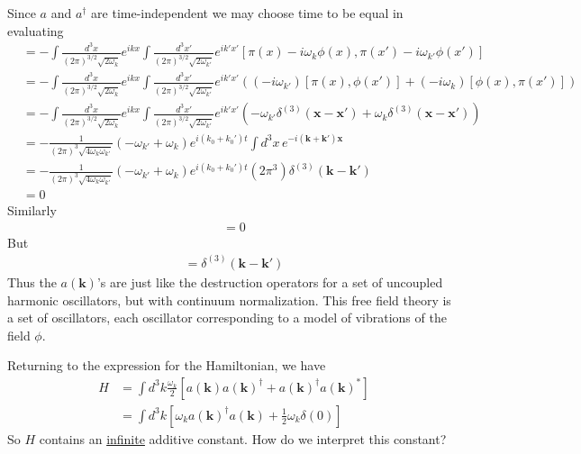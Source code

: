\documentclass{article}
\begin{document}
Since $a$ and $a^\dagger$ are time-independent we may choose time to be equal in evaluating
\begin{align}
[a(\mathbf{k}),a(\mathbf{k}')]
&=-\int\frac{d^3x}{(2\pi)^{3/2}\sqrt{2\omega_k}}e^{ikx}\int\frac{d^3x'}{(2\pi)^{3/2}\sqrt{2\omega_{k'}}}e^{ik'x'}
[\pi(x)-i\omega_k\phi(x),\pi(x')-i\omega_{k'}\phi(x')]\\
&=-\int\frac{d^3x}{(2\pi)^{3/2}\sqrt{2\omega_k}}e^{ikx}\int\frac{d^3x'}{(2\pi)^{3/2}\sqrt{2\omega_{k'}}}e^{ik'x'}
\left((-i\omega_{k'})[\pi(x),\phi(x')]+(-i\omega_{k})[\phi(x),\pi(x')]\right)\\
&=-\int\frac{d^3x}{(2\pi)^{3/2}\sqrt{2\omega_k}}e^{ikx}\int\frac{d^3x'}{(2\pi)^{3/2}\sqrt{2\omega_{k'}}}e^{ik'x'}
\left(-\omega_{k'}\delta^{(3)}(\mathbf{x}-\mathbf{x}')+\omega_{k}\delta^{(3)}(\mathbf{x}-\mathbf{x}')\right)\\
&=-\frac{1}{(2\pi)^{3}\sqrt{4\omega_k\omega_{k'}}}\left(-\omega_{k'}+\omega_{k}\right)e^{i(k_0+k_0')t}\int d^3x\,e^{-i(\mathbf{k}+\mathbf{k}')\mathbf{x}}\\
&=-\frac{1}{(2\pi)^{3}\sqrt{4\omega_k\omega_{k'}}}\left(-\omega_{k'}+\omega_{k}\right)e^{i(k_0+k_0')t}(2\pi^3)\delta^{(3)}(\mathbf{k}-\mathbf{k}')\\
&=0
\end{align}
Similarly
\begin{align}
[a(\mathbf{k})^\dagger,a(\mathbf{k}')^\dagger]=0
\end{align}
But
\begin{align}
[a(\mathbf{k}),a(\mathbf{k}')^\dagger]=\delta^{(3)}(\mathbf{k}-\mathbf{k}')
\end{align}
Thus the $a(\mathbf{k})$'s are just like the destruction operators for a set of uncoupled harmonic oscillators, but with continuum normalization. This free field theory is a set of oscillators, each oscillator corresponding to a model of vibrations of the field $\phi$.

Returning to the expression for the Hamiltonian, we have
\begin{align}
H
&=\int d^3k\frac{\omega_k}{2}[a(\mathbf{k})a(\mathbf{k})^\dagger+a(\mathbf{k})^\dagger a(\mathbf{k})^*]\\
&=\int d^3k\left[\omega_k a(\mathbf{k})^\dagger a(\mathbf{k})+\frac{1}{2}\omega_k\delta(0)\right]
\end{align}
So $H$ contains an \underline{infinite} additive constant. How do we interpret this constant? 
\end{document}
